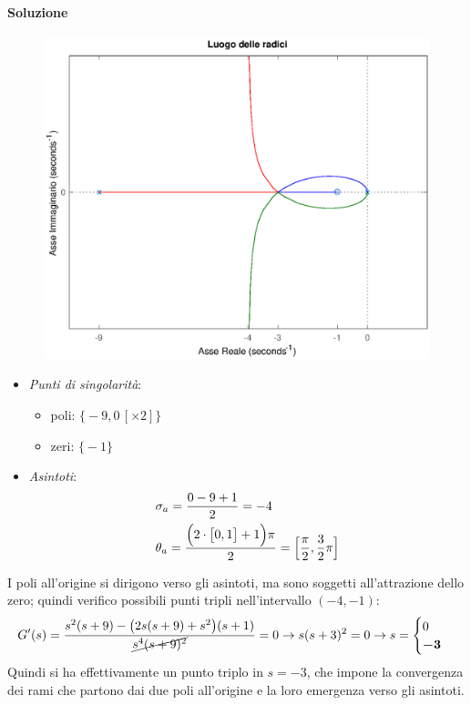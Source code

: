 \paragraph{Soluzione}

\begin{figure}[ht]
	\centering
	\includegraphics[scale=.6]{mod1/assets/rl_ex36}
\end{figure}

\begin{itemize}
	\item \emph{Punti di singolarità}:
		\begin{itemize}
			\item poli: \(\bigl\{ -9, 0\,[\times 2] \bigr\}\)
			\item zeri: \(\bigl\{ -1 \bigr\}\)
		\end{itemize}
	\item \emph{Asintoti}:
		\begin{align*}
			& \sigma_a = \frac{0-9+1}{2} = -4 \\
			& \theta_a = \frac{\Bigl(2 \cdot \bigl[ 0,1 \bigr] +1\Bigr) \pi}{2} = \Bigl[ \frac{\pi}{2}, \frac{3}{2}\pi \Bigr]
		\end{align*}
\end{itemize}
I poli all'origine si dirigono verso gli asintoti, ma sono soggetti all'attrazione
dello zero; quindi verifico possibili punti tripli nell'intervallo \((-4,-1)\):
\[
	G^\prime(s) = \frac{s^2(s+9) -\bigl(2s(s+9)+s^2\bigr)(s+1)}{\cancel{s^4 (s+9)^2}} = 0
	\rightarrow s(s+3)^2 = 0 \rightarrow s = \begin{cases} 0 \\ \bm{-3} \end{cases}
\]
Quindi si ha effettivamente un punto triplo in \(s = -3\), che impone la convergenza
dei rami che partono dai due poli all'origine e la loro emergenza verso gli asintoti.


